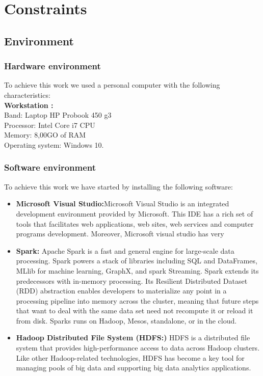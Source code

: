 \documentclass[a4paper]{report}
\begin{document}
\chapter{Constraints}
\section{Environment}
\subsection{Hardware environment}

To achieve this work we used a personal computer with the following characteristics:\\	
{\bf Workstation :}\\
Band: Laptop HP Probook 450 g3\\
Processor: Intel Core i7 CPU\\
Memory: 8,00GO of RAM\\
Operating system: Windows 10.

\subsection{Software environment}

To achieve this work we have started by installing the following software:
\begin{itemize}
\item \textbf{Microsoft Visual Studio:}Microsoft Visual Studio is an integrated development environment provided by Microsoft. This IDE has a rich set
of tools that facilitates web applications, web sites, web services and computer programs
development. Moreover, Microsoft visual studio has very
\item \textbf{Spark:} Apache Spark is a fast and general engine for large-scale data processing. Spark powers a stack of libraries including SQL and DataFrames, MLlib for machine learning, GraphX, and spark Streaming. Spark extends its predecessors with in-memory processing. Its Resilient Distributed Dataset (RDD) abstraction enables developers to materialize any point in a processing pipeline into memory across the cluster, meaning that future steps that want to deal with the same data set need not recompute it or reload it from disk. Sparks runs on Hadoop, Mesos, standalone, or in the cloud.
\item \textbf{Hadoop Distributed File System (HDFS:)} HDFS is a distributed file system that provides high-performance access to data across Hadoop clusters. Like other Hadoop-related technologies, HDFS has become a key tool for managing pools of big data and supporting big data analytics applications.
\end{itemize}
\end{document}
